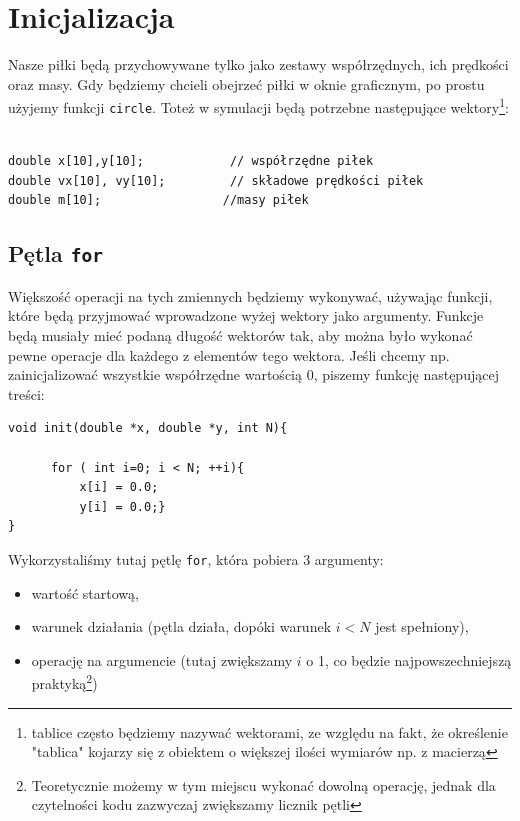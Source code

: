\documentclass{instrukcja}
\begin{document}
\section {Inicjalizacja}
Nasze piłki będą przychowywane tylko jako zestawy współrzędnych, ich prędkości oraz masy. Gdy będziemy chcieli obejrzeć piłki w oknie graficznym, po prostu użyjemy funkcji {\tt circle}. Toteż w symulacji będą potrzebne następujące wektory\footnote{tablice często będziemy nazywać wektorami, ze względu na fakt, że określenie "tablica" kojarzy się z obiektem o większej ilości wymiarów np. z macierzą}:
\begin{verbatim} 

double x[10],y[10];            // współrzędne piłek
double vx[10], vy[10];         // składowe prędkości piłek
double m[10];                 //masy piłek
\end{verbatim}

\subsection* {Pętla {\tt for}}

Większość operacji na tych zmiennych będziemy wykonywać, używając funkcji, które będą przyjmować wprowadzone wyżej wektory jako argumenty. Funkcje będą musiały mieć podaną długość wektorów tak, aby można było wykonać pewne operacje dla każdego z elementów tego wektora.
Jeśli chcemy np. zainicjalizować wszystkie współrzędne wartością \(0\), piszemy funkcję następującej treści:

\begin{verbatim}
void init(double *x, double *y, int N){

      for ( int i=0; i < N; ++i){
          x[i] = 0.0;
          y[i] = 0.0;}
}
\end{verbatim}



Wykorzystaliśmy tutaj pętlę {\tt for}, która pobiera 3 argumenty:
\begin{itemize}
\item wartość startową,
\item warunek działania (pętla działa, dopóki warunek \(i<N\) jest spełniony),
\item operację na argumencie (tutaj zwiększamy \(i\) o 1, co będzie najpowszechniejszą praktyką\footnote{Teoretycznie możemy w tym miejscu wykonać dowolną operację, jednak dla czytelności kodu zazwyczaj zwiększamy licznik pętli})
\end{itemize}
\end{document}

